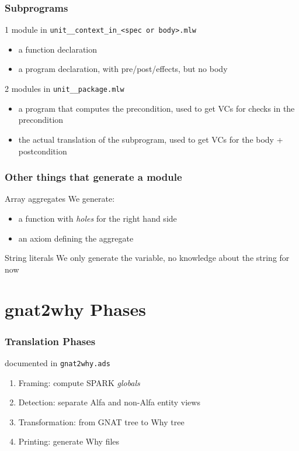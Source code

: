 \documentclass{beamer}
\newcommand{\vs}{\vspace{0.5cm}}
\newenvironment{specialframe}{%
  \begin{frame}[fragile,environment=specialframe]}{\end{frame}}
\begin{document}
\begin{specialframe}\frametitle{Subprograms}

1 module in \verb|unit__context_in_<spec or body>.mlw|
   \begin{itemize}
      \item a function declaration
      \item a program declaration, with pre/post/effects, but no body
      \end{itemize}

\vs

2 modules in \verb|unit__package.mlw|
     \begin{itemize}
      \item a program that computes the precondition, used to get VCs
for checks in the precondition
      \item the actual translation of the subprogram, used to get
VCs for the body + postcondition
   \end{itemize}
\end{specialframe}

\begin{specialframe}\frametitle{Other things that generate a module}

   \begin{block}{Array aggregates}
      We generate:
   \begin{itemize}
      \item a function with \emph{holes} for the right hand side
      \item an axiom defining the aggregate
   \end{itemize}
   \end{block}
   \begin{block}{String literals}
      We only generate the variable, no knowledge about the string for now
   \end{block}
\end{specialframe}


\section{gnat2why Phases}

\begin{specialframe}\frametitle{Translation Phases}

  documented in \verb|gnat2why.ads|

  \vs

  \begin{enumerate}
  \item Framing: compute SPARK \emph{globals}
  \item Detection: separate Alfa and non-Alfa entity views
  \item Transformation: from GNAT tree to Why tree
  \item Printing: generate Why files
  \end{enumerate}
\end{specialframe}
\end{document}
